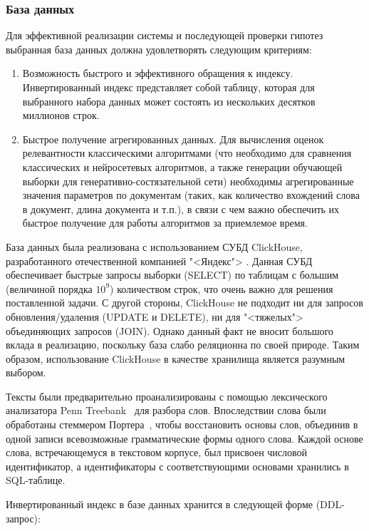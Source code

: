 \subsubsection{База данных}
\label{lab:db-grammar}
Для эффективной реализации системы и последующей проверки гипотез выбранная база данных должна удовлетворять следующим
критериям:
\begin{enumerate}[1)]
    \item Возможность быстрого и эффективного обращения к индексу. Инвертированный индекс представляет собой таблицу,
    которая для выбранного набора данных может состоять из нескольких десятков миллионов строк.
    \item Быстрое получение агрегированных данных. Для вычисления оценок релевантности классическими алгоритмами 
    (что необходимо для сравнения классических и нейросетевых алгоритмов, а также генерации обучающей выборки для
    генеративно-состязательной сети) необходимы агрегированные значения параметров по документам (таких, как
    количество вхождений слова в документ, длина документа и т.п.), в связи с чем важно обеспечить их быстрое
    получение для работы алгоритмов за приемлемое время.
\end{enumerate}

База данных была реализована с использованием СУБД ClickHouse, разработанного отечественной компанией "<Яндекс">
\cite{Clickhouse2020}. Данная СУБД обеспечивает быстрые запросы выборки (SELECT) по таблицам с большим (величиной порядка $10^9$)
количеством строк, что очень важно для решения поставленной задачи. С другой стороны, ClickHouse не подходит ни для запросов
обновления/удаления (UPDATE и DELETE), ни для "<тяжелых"> объединяющих запросов (JOIN). Однако данный факт 
не вносит большого вклада в реализацию, поскольку база слабо реляционна по своей природе. Таким образом, использование 
ClickHouse в качестве хранилища является разумным выбором.

Тексты были предварительно проанализированы с помощью лексического анализатора Penn Treebank~\cite{10.3115/1075812.1075835}
для разбора слов. Впоследствии слова были обработаны стеммером Портера~\cite{Porter1980AnAF}, чтобы восстановить основы слов, 
объединив в одной записи всевозможные грамматические формы одного слова.
Каждой основе слова, встречающемуся в текстовом корпусе, был присвоен числовой идентификатор, а идентификаторы 
с соответствующими основами хранились в SQL-таблице.

Инвертированный индекс в базе данных хранится в следующей форме (DDL-запрос):

